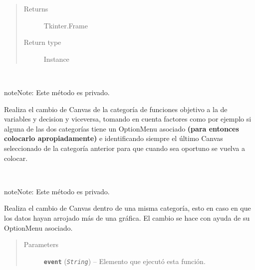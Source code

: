\documentclass[letterpaper,10pt,english]{sphinxmanual}
\begin{document}
\begin{fulllineitems}
\begin{quote}
\begin{description}
\item[{Returns}] \leavevmode
Tkinter.Frame

\item[{Return type}] \leavevmode
Instance

\end{description}\end{quote}

\begin{fulllineitems}
\label{View/Additional/ResultsGrapher/GraphFrame:View.Additional.ResultsGrapher.GraphFrame.GraphFrame._GraphFrame__change_canvas_category}~
\begin{notice}{note}{Note:}
Este método es privado.
\end{notice}

Realiza el cambio de Canvas de la categoría de funciones objetivo 
a la de variables y decision y viceversa, tomando en cuenta factores como por
ejemplo si alguna de las dos categorías tiene un OptionMenu asociado \textbf{(para entonces
colocarlo apropiadamente)} e identificando siempre el último Canvas seleccionado de 
la categoría anterior para que cuando sea oportuno se vuelva a colocar.

\end{fulllineitems}


\begin{fulllineitems}
\label{View/Additional/ResultsGrapher/GraphFrame:View.Additional.ResultsGrapher.GraphFrame.GraphFrame._GraphFrame__change_inner_canvas}~
\begin{notice}{note}{Note:}
Este método es privado.
\end{notice}

Realiza el cambio de Canvas dentro de una misma categoría, esto
en caso en que los datos hayan arrojado más de una gráfica. El cambio
se hace con ayuda de su OptionMenu asociado.
\begin{quote}\begin{description}
\item[{Parameters}] \leavevmode
\textbf{\texttt{event}} (\emph{\texttt{String}}) -- Elemento que ejecutó esta función.

\end{description}\end{quote}


\end{fulllineitems}
\end{fulllineitems}
\end{document}
